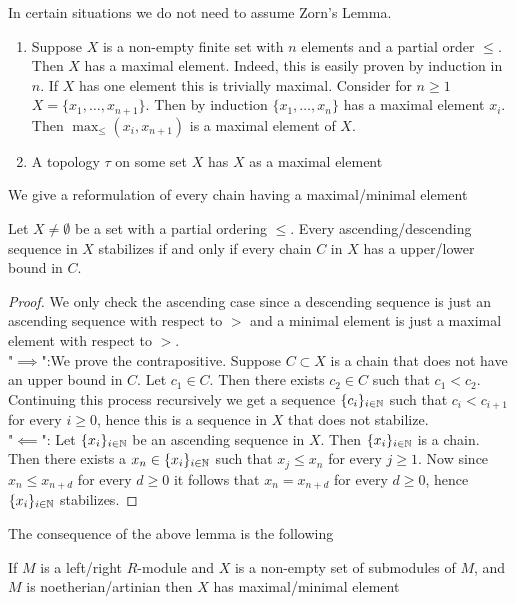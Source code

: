 \begin{example}
    In certain situations we do not need to assume Zorn's Lemma. 
    \begin{enumerate}
        \item Suppose $X$ is a non-empty finite set with $n$ elements and a partial order $\leq$. Then $X$ has a maximal element. Indeed, this is easily proven by induction in $n$. If $X$ has one element this is trivially maximal. Consider for $n\geq1$ $X= \{x_1,\dots,x_{n+1}\}$. Then by induction $\{x_1,\dots,x_n\}$ has a maximal element $x_i$. Then $\max_\leq(x_i,x_{n+1})$ is a maximal element of $X$. 
        \item A topology $\tau$ on some set $X$ has $X$ as a maximal element
    \end{enumerate}
     
\end{example}
We give a reformulation of every chain having a maximal/minimal element
\begin{lemma}
    Let $X\neq \emptyset$ be a set with a partial ordering $\leq$. Every ascending/descending sequence in $X$ stabilizes if and only if every chain $C$ in $X$ has a upper/lower bound in $C$.
\end{lemma}
\begin{proof}
    We only check the ascending case since a descending sequence is just an ascending sequence with respect to $>$ and a minimal element is just a maximal element with respect to $>$.\\
    "$\implies$":We prove the contrapositive. Suppose $C\subset X$ is a chain that does not have an upper bound in $C$. Let $c_1\in C$. Then there exists $c_2 \in C$ such that $c_1 < c_2$. Continuing this process recursively we get a sequence $\{c_i\}_{i\in \mathbb{N}}$ such that $c_i<c_{i+1}$ for every $i\geq 0$, hence this is a sequence in $X$ that does not stabilize.\\
    "$\impliedby$": Let $\{x_i\}_{i\in \mathbb{N}}$ be an ascending sequence in $X$. Then $\{x_i\}_{i\in \mathbb{N}}$ is a chain. Then there exists a $x_n\in \{x_i\}_{i\in \mathbb{N}}$ such that $x_j\leq x_n$ for every $j\geq 1$. Now since $x_n \leq x_{n+d}$ for every $d\geq 0$ it follows that $x_n=x_{n+d}$ for every $d\geq0$, hence $\{x_i\}_{i\in \mathbb{N}}$ stabilizes. 
\end{proof}
The consequence of the above lemma is the following 
\begin{proposition}\label{NoetherianRespArtinianImpliesMaximalMinimalElement}
    If $M$ is a left/right $R$-module and $X$ is a non-empty set of submodules of $M$, and $M$ is noetherian/artinian then $X$ has maximal/minimal element
\end{proposition}
